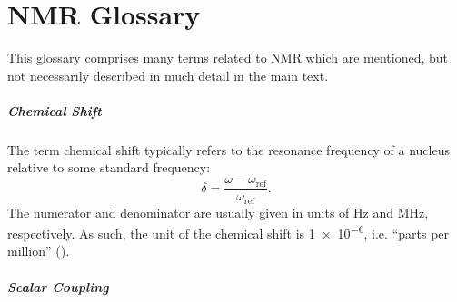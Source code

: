 \chapter{\acs{NMR} Glossary}
\label{chap:nmr-glossary}

This glossary comprises many terms related to \ac{NMR} which are mentioned, but
not necessarily described in much detail in the main text.


\paragraph{Chemical Shift} The term chemical shift typically refers to the
resonance frequency of a nucleus relative to some standard frequency:
\begin{equation}
    \delta = \frac{\omega - \omega_{\text{ref}}}{\omega_{\text{ref}}}.
\end{equation}
The numerator and denominator are usually given in units of \unit{\hertz} and
\unit{\mega\hertz}, respectively. As such, the unit of the chemical shift is
\num{1e-6}, i.e. ``parts per million'' (\unit{\partspermillion}).

\paragraph{Scalar Coupling}
